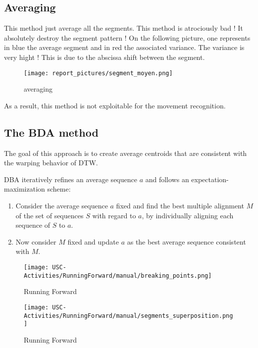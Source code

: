 \documentclass[a4,12pt]{article}
\begin{document}
	\subsection{Averaging}
		
		This method just average all the segments. This method is atrociously bad ! It absolutely destroy the segment pattern ! On the following picture, one represents in blue the average segment and in red the associated variance. The variance is very hight ! This is due to the abscissa shift between the segment.
		
	\begin{figure}[H]
		\centering
		\texttt{[image: report\_pictures/segment\_moyen.png]}
		\caption{averaging}
		\label{Just averaging}
	\end{figure}
	
		As a result, this method is not exploitable for the movement recognition.
		
	\subsection{The BDA method}
		
	The goal of this approach is to create average centroids that are consistent with the warping behavior of DTW. 
	
	DBA iteratively refines an average sequence $a$ and follows an expectation-maximization scheme:
	\begin{enumerate}
		\item Consider the average sequence $a$ fixed and find the best multiple alignment $M$ of the set of sequences $S$ with regard to $a$, by individually aligning each sequence of $S$ to $a$.
		\item Now consider $M$ fixed and update $a$ as the best average sequence consistent with $M$.
	\end{enumerate}

	\begin{figure}[H]
		\centering
		\texttt{[image: USC-Activities/RunningForward/manual/breaking\_points.png]}
		\caption{Running Forward}
		\label{RunningForward}
	\end{figure}
	
	\begin{figure}[H]
		\centering
		\texttt{[image: USC-Activities/RunningForward/manual/segments\_superposition.png]}
		\caption{Running Forward}
		\label{RunningForwardAverage}
	\end{figure}
	
\end{document}
